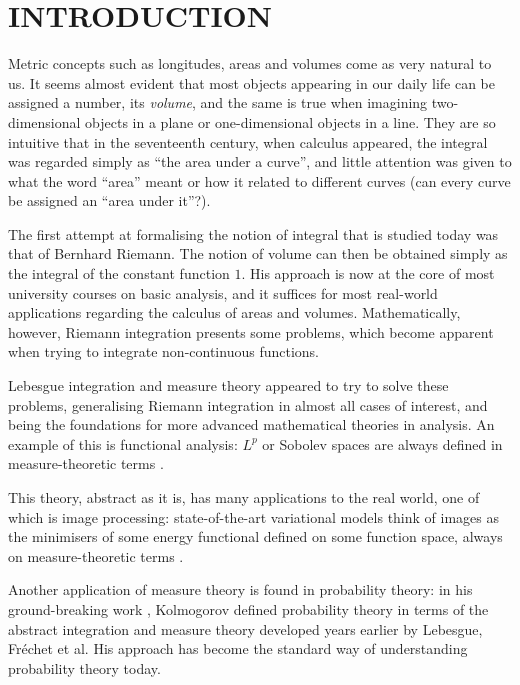 
\chapter{INTRODUCTION}

Metric concepts such as longitudes, areas and volumes come as very natural to us. It seems almost evident that most objects appearing in our daily life can
be assigned a number, its \emph{volume}, and the same is true when imagining two-dimensional objects in a plane or one-dimensional objects in a line.
They are so intuitive that in the seventeenth century, when calculus appeared, the integral was regarded simply as ``the area under a curve'', and little 
attention was given to what the word ``area'' meant or how it related to different curves (can every curve be assigned an ``area under it''?).

The first attempt at formalising the notion of integral that is studied today was that of Bernhard Riemann. The notion of volume can then be obtained simply as the integral of the constant function \(1\). His approach is now at the core of most university courses on basic analysis, and it suffices for most real-world applications regarding the calculus of areas and volumes. Mathematically, however, Riemann integration presents some problems, which become apparent when trying to integrate non-continuous functions.

Lebesgue integration and measure theory appeared to try to solve these problems, generalising Riemann integration in almost all cases of interest, and being the foundations for more advanced mathematical theories in analysis. An example of this is functional analysis: \(L^p\) or Sobolev spaces are always defined in measure-theoretic terms \cite{brezis,rudin2006real}. 

This theory, abstract as it is, has many applications to the real world, one of which is image processing: state-of-the-art variational models think of images as the minimisers of some energy functional defined on some function space, always on measure-theoretic terms \cite{hammond2024two,duran2014nonlocal}.

Another application of measure theory is found in probability theory: in his ground-breaking work \cite{Grundbegriffe}, Kolmogorov defined probability theory in terms of the abstract integration and measure theory developed years earlier by Lebesgue, Fréchet et al. %
His approach has become the standard way of understanding probability theory today.

